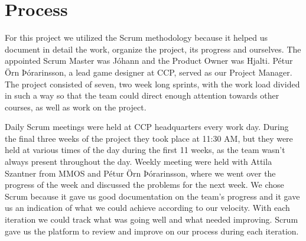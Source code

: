 \section{Process}\label{sec:process}
For this project we utilized the Scrum methodology because it helped us document in detail the work, organize the project, its progress and ourselves.  The appointed Scrum Master was Jóhann and the Product Owner was Hjalti. Pétur Örn Þórarinsson, a lead game designer at CCP, served as our Project Manager. The project consisted of seven, two week long sprints, with the work load divided in such a way so that the team could direct enough attention towards other courses, as well as work on the project.

Daily Scrum meetings were held at CCP headquarters every work day.  During the final three weeks of the project they took place at 11:30 AM, but they were held at various times of the day during the first 11 weeks, as the team wasn't always present throughout the day. Weekly meeting were held with Attila Szantner from MMOS and Pétur Örn Þórarinsson, where we went over the progress of the week and discussed the problems for the next week. We chose Scrum because it gave us good documentation on the team's progress and it gave us an indication of what we could achieve according to our velocity. With each iteration we could track what was going well and what needed improving. Scrum gave us the platform to review and improve on our process during each iteration. 
